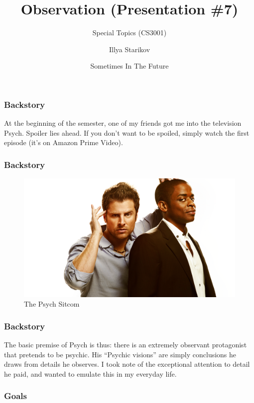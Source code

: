 \documentclass[xclolor=dvipsnames]{beamer}            %
\title{Observation (Presentation \#7)}
\subtitle{Special Topics (CS3001)}
\author{Illya Starikov}
\date{Sometimes In The Future}
\institute{Missouri University of Science and Technology}
\begin{document}
\begin{darkframes}
    \maketitle

    \begin{frame}
        \frametitle{Backstory}

        At the beginning of the semester, one of my friends got me into the television Psych. Spoiler lies ahead. If you don't want to be spoiled, simply watch the first episode (it's on Amazon Prime Video).

    \end{frame}

    \begin{frame}
        \frametitle{Backstory}

        \begin{figure}[H]
            \centering
            \includegraphics[width=.9\linewidth]{assets/psych.png}
            \caption{The Psych Sitcom}
            \label{fig:psych}
        \end{figure}

    \end{frame}

    \begin{frame}
        \frametitle{Backstory}

        The basic premise of Psych is thus: there is an extremely observant protagonist that pretends to be psychic. His ``Psychic visions'' are simply conclusions he draws from details he observes. I took note of the exceptional attention to detail he paid, and wanted to emulate this in my everyday life.

    \end{frame}

    \begin{frame}
        \frametitle{Goals}


\end{frame}
\end{darkframes}
\end{document}
